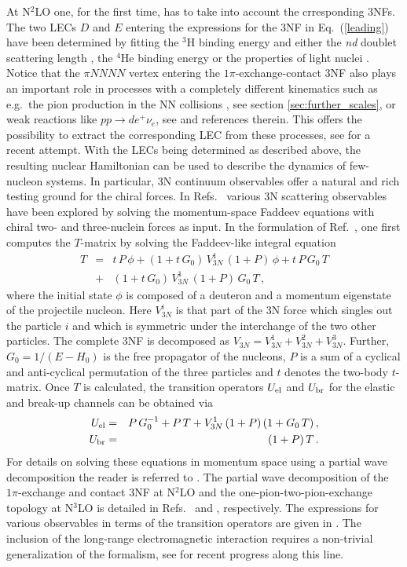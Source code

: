 \documentclass[aps,rmp,nofootinbib,twocolumn,floatfix]{revtex4}
\newcommand{\beqa}{\begin{eqnarray}}
\newcommand{\eeqa}{\end{eqnarray}}
\newcommand{\nn}{\nonumber \\ }
\begin{document}
At N$^2$LO one, for the first time, has to take into account the crresponding
3NFs.  The two LECs $D$ and $E$ entering the expressions for the 3NF in
Eq.~(\ref{leading}) have been determined by fitting the $^3$H binding energy   
and either the {\it nd} doublet scattering length \cite{Epelbaum:2002vt}, 
the $^4$He binding energy \cite{Nogga:2005hp} or the properties of light nuclei
\cite{Navratil:2007we}.  
Notice that the $\pi NNNN$ vertex entering the $1\pi$-exchange-contact 3NF 
also plays an important role in processes with a completely different
kinematics such as e.g.~the pion production in the NN collisions
\cite{Hanhart:2000gp}, see section \ref{sec:further_scales},  or weak
reactions like $pp\to d e^+ \nu_e$,  
see \cite{Nakamura:2007vi} and references therein. This offers the
possibility to extract the corresponding LEC from these processes, see
\cite{Nakamura:2007vi} for a recent attempt. With the LECs being determined as
described above, the resulting nuclear Hamiltonian can be used to describe the
dynamics of few-nucleon systems. In particular,  3N
continuum observables offer a natural and rich 
testing ground for the chiral forces. In
Refs.~\cite{Epelbaum:2000mx,Epelbaum:2002ji,Epelbaum:2002vt,Ermisch:2003zq,
Duweke:2004xv,Ermisch:2005kf,Kistryn:2005fi,Witala:2006nn,Biegun:2006zc,
Ley:2006hu,Stephan:2007zza}
various 3N scattering
observables have been explored by solving the momentum-space Faddeev
equations with chiral two- and three-nuclein forces as input. 
In the formulation 
of Ref.~\cite{Gloeckle:1995jg}, one first computes the $T$-matrix
by solving the Faddeev-like integral equation 
\beqa
\label{eq2}
T &=& t \,  P  \, \phi + (1 + t  \, G_0)  \, V_{3N}^{1}  \, (1 +
P)  \, \phi + t  \, P  \, G_0  \, T  \nn
&+&  (1 + t  \, G_0)   
\, V_{3N}^{1} \,  (1 + P)  \, G_0  \, T\,,
\eeqa
where the initial state $\phi$ is composed of a deuteron and a
momentum eigenstate of the projectile nucleon.  
Here $V_{3N}^{i}$ is that part of the 3N force
which singles out the particle $i$ and which is symmetric under the
interchange of the two other particles. The complete 3NF is decomposed as
$V_{3N} = V_{3N}^{1}+ V_{3N}^{2}+V_{3N}^{3}$.
Further, $G_0=1/(E-H_0)$ is the free propagator of the nucleons,  
$P$ is a sum of a cyclical and anti-cyclical permutation of the three particles
and $t$ denotes the two-body $t$-matrix.
Once $T$ is calculated, the transition operators
$U_{\rm el}$ and $U_{\rm br}$ for the elastic and break-up channels can
be obtained via
\beqa
U_{\rm el} &=&P  \, G_0^{-1} + P  \, T + V_{3N}^{1} \,  (1 + P) \,  (1 +
G_0  \, T)\,, \nn
U_{\rm br} &=& (1 + P)  \, T\,.
\eeqa
For details on solving these equations in momentum space using a
partial wave decomposition the reader is referred to 
\cite{Huber:1996td}. The partial wave decomposition of the $1\pi$-exchange and
contact 3NF at N$^2$LO and the one-pion-two-pion-exchange topology at N$^3$LO
is detailed in Refs.~\cite{Epelbaum:2002vt} and \cite{Kamada:2008zz},
respectively. The expressions
for various observables in terms of the transition operators are given in
\cite{Gloeckle:1995jg}. 
The inclusion of the long-range 
electromagnetic interaction requires a non-trivial generalization of the formalism,
see \cite{Deltuva:2005cc,Deltuva:2005zz} for recent progress along this line.  
 
\end{document}
